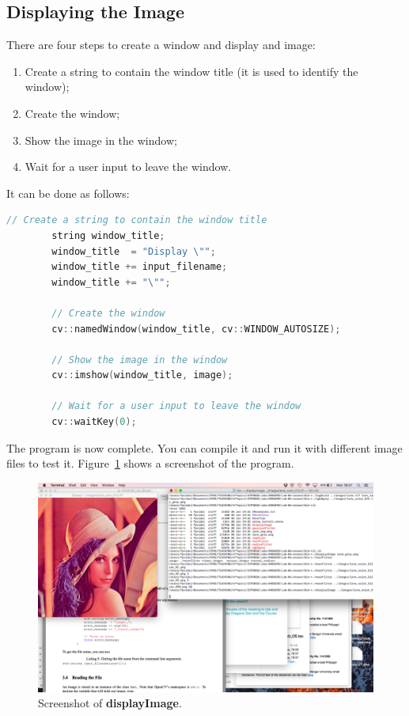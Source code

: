 \documentclass[english,a4paper,12pt,oneside]{article}
\begin{document}
\subsection{Displaying the Image}

There are four steps to create a window and display and image:
\begin{enumerate}
 \item Create a string to contain the window title (it is used to identify the window);
 \item Create the window;
 \item Show the image in the window;
 \item Wait for a user input to leave the window.
\end{enumerate}

It can be done as follows:
\begin{lstlisting}[language=c++,caption=Create an image.]
        // Create a string to contain the window title
        string window_title;
        window_title  = "Display \"";
        window_title += input_filename;
        window_title += "\"";

        // Create the window
        cv::namedWindow(window_title, cv::WINDOW_AUTOSIZE);

        // Show the image in the window
        cv::imshow(window_title, image);

        // Wait for a user input to leave the window
        cv::waitKey(0);
\end{lstlisting}

The program is now complete. 
You can compile it and run it with different image files to test it.
Figure~\ref{fig:displayImage} shows a screenshot of the program. 

    \begin {figure}[htb]
			\centering
			\includegraphics[width=\textwidth]{displayImage}
      \caption{\label{fig:displayImage}Screenshot of \textbf{displayImage}.}
    \end {figure}
\end{document}
